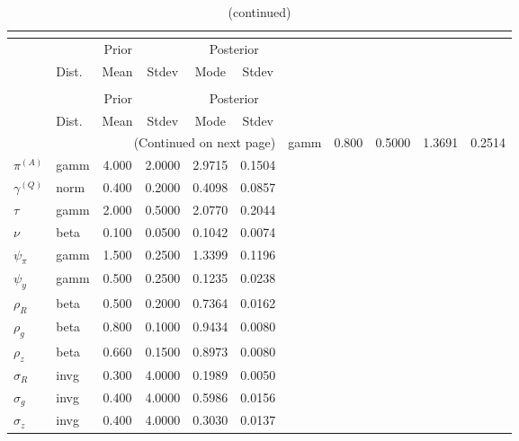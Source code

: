  
\begin{center}
\begin{longtable}{llcccc} 
\caption{Results from posterior maximization (parameters)}\\
 \label{Table:Posterior:1}\\
\toprule 
  & \multicolumn{3}{c}{Prior}  &  \multicolumn{2}{c}{Posterior} \\
  \cmidrule(r{.75em}){2-4} \cmidrule(r{.75em}){5-6}
  & Dist. & Mean  & Stdev & Mode & Stdev \\ 
\midrule \endfirsthead 
\caption{(continued)}\\
 \bottomrule 
  & \multicolumn{3}{c}{Prior}  &  \multicolumn{2}{c}{Posterior} \\
  \cmidrule(r{.75em}){2-4} \cmidrule(r{.75em}){5-6}
  & Dist. & Mean  & Stdev & Mode & Stdev \\ 
\midrule \endhead 
\bottomrule \multicolumn{6}{r}{(Continued on next page)}\endfoot 
\bottomrule\endlastfoot 
${r_{A}}$ & gamm &   0.800 & 0.5000 &   1.3691 &  0.2514 \\ 
${\pi^{(A)}}$ & gamm &   4.000 & 2.0000 &   2.9715 &  0.1504 \\ 
${\gamma^{(Q)}}$ & norm &   0.400 & 0.2000 &   0.4098 &  0.0857 \\ 
${\tau}$ & gamm &   2.000 & 0.5000 &   2.0770 &  0.2044 \\ 
${\nu}$ & beta &   0.100 & 0.0500 &   0.1042 &  0.0074 \\ 
${\psi_\pi}$ & gamm &   1.500 & 0.2500 &   1.3399 &  0.1196 \\ 
${\psi_y}$ & gamm &   0.500 & 0.2500 &   0.1235 &  0.0238 \\ 
${\rho_R}$ & beta &   0.500 & 0.2000 &   0.7364 &  0.0162 \\ 
${\rho_{g}}$ & beta &   0.800 & 0.1000 &   0.9434 &  0.0080 \\ 
${\rho_z}$ & beta &   0.660 & 0.1500 &   0.8973 &  0.0080 \\ 
${\sigma_R}$ & invg &   0.300 & 4.0000 &   0.1989 &  0.0050 \\ 
${\sigma_{g}}$ & invg &   0.400 & 4.0000 &   0.5986 &  0.0156 \\ 
${\sigma_z}$ & invg &   0.400 & 4.0000 &   0.3030 &  0.0137 \\ 
\end{longtable}
 \end{center}

